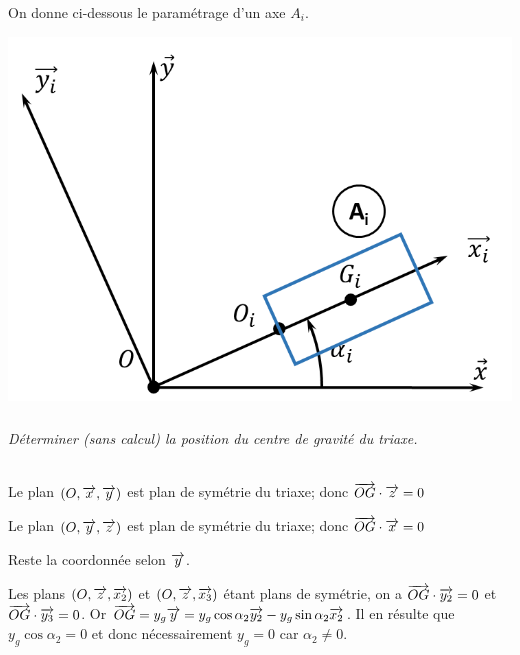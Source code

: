 \documentclass[10pt,fleqn]{article} %
\begin{document}
\begin{multicols}{2}
On donne ci-dessous le paramétrage d'un axe $A_i$.

\begin{center}
\includegraphics[width=.8\linewidth]{images/param.png}
\end{center}
\subparagraph{}
\textit{Déterminer (sans calcul) la position du centre de gravité du triaxe. }
\ifprof
\begin{corrige} ~\\

Le plan $\left(O,\overrightarrow{x},\overrightarrow{y}\right)$ est plan de symétrie du triaxe; donc $\overrightarrow{OG}\cdot\overrightarrow{z} =0$

Le plan $\left(O,\overrightarrow{y},\overrightarrow{z}\right)$ est plan de symétrie du triaxe; donc $\overrightarrow{OG}\cdot\overrightarrow{x} =0$

Reste la coordonnée selon $\overrightarrow{y}$. 

Les plans $\left(O,\overrightarrow{z},\overrightarrow{x_2}\right)$ et $\left(O,\overrightarrow{z},\overrightarrow{x_3}\right)$ étant plans de symétrie, on a 
 $\overrightarrow{OG}\cdot\overrightarrow{y_2} =0$ et  $\overrightarrow{OG}\cdot\overrightarrow{y_3} =0$. 
 Or $\overrightarrow{OG}= y_g \overrightarrow{y} =  y_g \cos \alpha_2 \overrightarrow{y_2} - y_g \sin \alpha_2 \overrightarrow{x_2}$. Il en résulte que   $y_g \cos \alpha_2 = 0$ et donc nécessairement $y_g=0$ car $\alpha_2\neq 0$. 
\end{corrige}
\else
\fi




\end{multicols}
\end{document}
